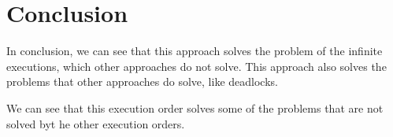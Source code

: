 \chapter{Conclusion}\label{chap:conclusion}

In conclusion, we can see that this approach solves the problem of the infinite executions, which other approaches do not solve. This approach also solves the problems that other approaches do solve, like deadlocks.

We can see that this execution order solves some of the problems that are not solved byt he other execution orders.
